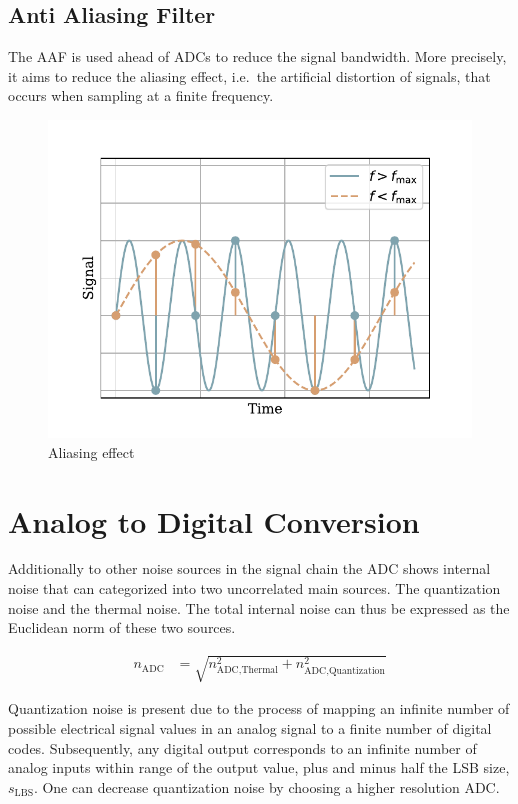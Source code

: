 \subsection{Anti Aliasing Filter}
The \acf{AAF} is used ahead of \ac{ADC}s to reduce the signal bandwidth. More precisely, it aims to reduce the aliasing effect, i.e.\ the artificial distortion of signals, that occurs when sampling at a finite frequency.

\begin{figure}[!htb]
  \centering
  \includegraphics[scale=0.72]{figures/electronics/aaf/plot_aliasing}
  \caption[Aliasing]{Aliasing effect%
    \label{fig:plot_aliasing}}
\end{figure}

\section{Analog to Digital Conversion}

Additionally to other noise sources in the signal chain the \ac{ADC} shows internal noise that can categorized into two uncorrelated main sources. The quantization noise and the thermal noise. The total internal noise can thus be expressed as the Euclidean norm of these two sources.

\begin{align}
  n_\text{ADC} &= \sqrt{n_{\text{ADC},\text{Thermal}}^2 + n_{\text{ADC},\text{Quantization}}^2}
\end{align}

Quantization noise is present due to the process of mapping an infinite number of possible electrical signal values in an analog signal to a finite number of digital codes. Subsequently, any digital output corresponds to an infinite number of analog inputs within range of the output value, plus and minus half the \ac{LSB} size, $s_\text{LBS}$. One can decrease quantization noise by choosing a higher resolution \ac{ADC}.

